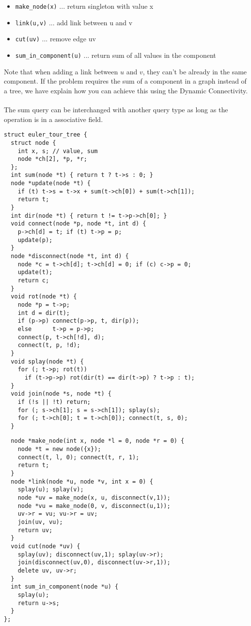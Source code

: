 {
\begin{itemize}
  \item{\lstinline{make_node(x)} ... return singleton with value x}
  \item{\lstinline{link(u,v)} ... add link between u and v}
  \item{\lstinline{cut(uv)} ... remove edge uv}
  \item{\lstinline{sum_in_component(u)} ... return sum of all values in the component}
\end{itemize}
}

Note that when adding a link between $u$ and $v$, they can't be already in the same component.
If the problem requires the sum of a component in a graph instead of a tree, we have explain
how you can achieve this using the Dynamic Connectivity.
\\
\\
The sum query can be interchanged with another query type
as long as the operation is in a associative field.


\begin{center}
\begin{minipage}[t]{0.45\linewidth}
\begin{lstlisting}
struct euler_tour_tree {
  struct node {
    int x, s; // value, sum
    node *ch[2], *p, *r;
  };
  int sum(node *t) { return t ? t->s : 0; }
  node *update(node *t) {
    if (t) t->s = t->x + sum(t->ch[0]) + sum(t->ch[1]);
    return t;
  }
  int dir(node *t) { return t != t->p->ch[0]; }
  void connect(node *p, node *t, int d) {
    p->ch[d] = t; if (t) t->p = p;
    update(p);
  }
  node *disconnect(node *t, int d) {
    node *c = t->ch[d]; t->ch[d] = 0; if (c) c->p = 0; 
    update(t);
    return c;
  }
  void rot(node *t) {
    node *p = t->p;
    int d = dir(t); 
    if (p->p) connect(p->p, t, dir(p));
    else      t->p = p->p;
    connect(p, t->ch[!d], d);
    connect(t, p, !d);
  }
  void splay(node *t) {
    for (; t->p; rot(t))
      if (t->p->p) rot(dir(t) == dir(t->p) ? t->p : t);
  }
  void join(node *s, node *t) {
    if (!s || !t) return;
    for (; s->ch[1]; s = s->ch[1]); splay(s);
    for (; t->ch[0]; t = t->ch[0]); connect(t, s, 0);
  }
\end{lstlisting}
\end{minipage}
\qquad
\begin{minipage}[t]{0.45\linewidth}
\begin{lstlisting}
  node *make_node(int x, node *l = 0, node *r = 0) {
    node *t = new node({x});
    connect(t, l, 0); connect(t, r, 1);
    return t;
  }
  node *link(node *u, node *v, int x = 0) {
    splay(u); splay(v); 
    node *uv = make_node(x, u, disconnect(v,1));
    node *vu = make_node(0, v, disconnect(u,1));
    uv->r = vu; vu->r = uv;
    join(uv, vu);
    return uv;
  }
  void cut(node *uv) {
    splay(uv); disconnect(uv,1); splay(uv->r); 
    join(disconnect(uv,0), disconnect(uv->r,1));
    delete uv, uv->r;
  }
  int sum_in_component(node *u) {
    splay(u);
    return u->s;
  }
};
\end{lstlisting}
\end{minipage}
\end{center}

